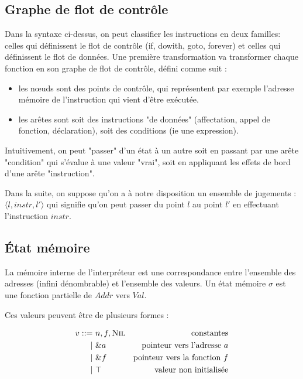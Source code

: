 \documentclass{phdthesis}
\begin{document}
\subsection{Graphe de flot de contrôle}

Dans la syntaxe ci-dessus, on peut classifier les instructions en deux familles:
celles qui définissent le flot de contrôle (if, dowith, goto, forever) et celles
qui définissent le flot de données. Une première transformation va transformer
chaque fonction en son graphe de flot de contrôle, défini comme suit :

\begin{itemize}
\item
  les nœuds sont des points de contrôle, qui représentent par exemple
  l'adresse mémoire de l'instruction qui vient d'être exécutée.
\item
  les arêtes sont soit des instructions "de données" (affectation,
  appel de fonction, déclaration), soit des conditions (ie une
  expression).
\end{itemize}

Intuitivement, on peut "passer" d'un état à un autre soit en passant par une
arête "condition" qui s'évalue à une valeur "vrai", soit en appliquant les
effets de bord d'une arête "instruction".

Dans la suite, on suppose qu'on a à notre disposition un ensemble de jugements :
$\langle l, instr, l' \rangle$ qui signifie qu'on peut passer du point $l$ au
point $l'$ en effectuant l'instruction $instr$.

\subsection{État mémoire}

La mémoire interne de l'interpréteur est une correspondance entre l'ensemble des
adresses (infini dénombrable) et l'ensemble des valeurs. Un état mémoire $σ$ est
une fonction partielle de $Addr$ vers $Val$.

Ces valeurs peuvent être de plusieurs formes :

\begin{align*}
v   ::=~ & n, f, \textsc{Nil} & \text{constantes}\\
      |~ & \&a         & \text{pointeur vers l'adresse $a$}\\
      |~ & \&f         & \text{pointeur vers la fonction $f$}\\
      |~ & \top        & \text{valeur non initialisée}
\end{align*}
\end{document}
